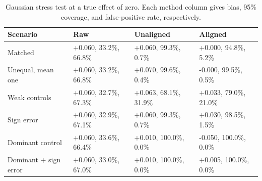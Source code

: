 \begin{table}[htbp]\centering\small
\caption{Gaussian stress test at a true effect of zero. Each method column gives bias, 95\% coverage, and false-positive rate, respectively.}\label{tab:gaussian-stress}
\begin{tabularx}{\textwidth}{Xlll}\toprule
Scenario & Raw & Unaligned & Aligned\\\midrule
Matched & +0.060, 33.2\%, 66.8\% & +0.060, 99.3\%, 0.7\% & +0.000, 94.8\%, 5.2\% \\
Unequal, mean one & +0.060, 33.2\%, 66.8\% & +0.070, 99.6\%, 0.4\% & -0.000, 99.5\%, 0.5\% \\
Weak controls & +0.060, 32.7\%, 67.3\% & +0.063, 68.1\%, 31.9\% & +0.033, 79.0\%, 21.0\% \\
Sign error & +0.060, 32.9\%, 67.1\% & +0.060, 99.3\%, 0.7\% & +0.030, 98.5\%, 1.5\% \\
Dominant control & +0.060, 33.6\%, 66.4\% & +0.010, 100.0\%, 0.0\% & -0.050, 100.0\%, 0.0\% \\
Dominant + sign error & +0.060, 33.0\%, 67.0\% & +0.010, 100.0\%, 0.0\% & +0.005, 100.0\%, 0.0\% \\
\bottomrule\end{tabularx}\end{table}
